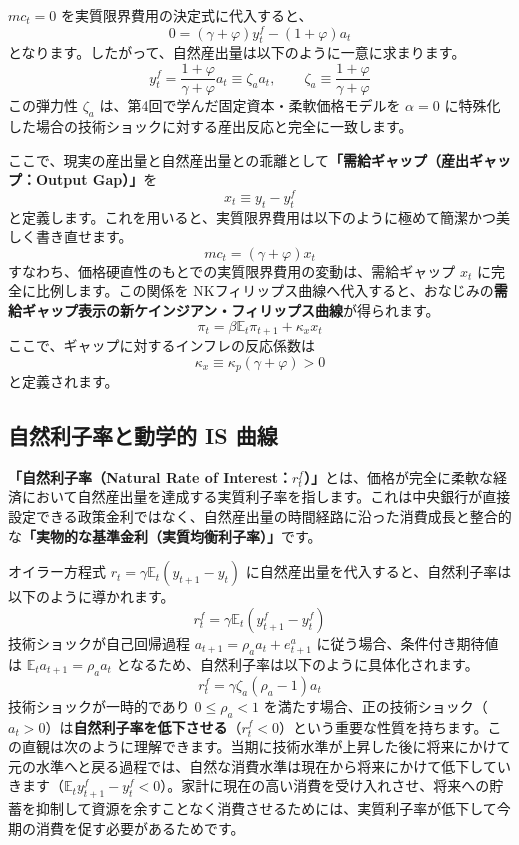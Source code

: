 \documentclass[
  japanese,
  lualatex,
  ja=standard,
  12pt,
  a4paper]{ltjsarticle}
\begin{document}
\(mc_t=0\) を実質限界費用の決定式に代入すると、 \[
0=
(\gamma+\varphi)y_t^f
-(1+\varphi)a_t
\] となります。したがって、自然産出量は以下のように一意に求まります。 \[
y_t^f=
\frac{1+\varphi}{\gamma+\varphi}
a_t
\equiv
\zeta_a a_t,
\qquad
\zeta_a\equiv
\frac{1+\varphi}{\gamma+\varphi}
\] この弾力性 \(\zeta_a\) は、第4回で学んだ固定資本・柔軟価格モデルを
\(\alpha=0\)
に特殊化した場合の技術ショックに対する産出反応と完全に一致します。

ここで、現実の産出量と自然産出量との乖離として\textbf{「需給ギャップ（産出ギャップ：Output
Gap）」}を \[
x_t\equiv y_t-y_t^f
\]
と定義します。これを用いると、実質限界費用は以下のように極めて簡潔かつ美しく書き直せます。
\[
mc_t=
(\gamma+\varphi)x_t
\] すなわち、価格硬直性のもとでの実質限界費用の変動は、需給ギャップ
\(x_t\) に完全に比例します。この関係を
NKフィリップス曲線へ代入すると、おなじみの\textbf{需給ギャップ表示の新ケインジアン・フィリップス曲線}が得られます。
\[
\pi_t=\beta\mathbb{E}_t\pi_{t+1}+\kappa_x x_t
\] ここで、ギャップに対するインフレの反応係数は \[
\kappa_x\equiv
\kappa_p(\gamma+\varphi)>0
\] と定義されます。

\subsection{自然利子率と動学的 IS
曲線}\label{ux81eaux7136ux5229ux5b50ux7387ux3068ux52d5ux5b66ux7684-is-ux66f2ux7dda}

\textbf{「自然利子率（Natural Rate of
Interest：\(r_t^f\)）」}とは、価格が完全に柔軟な経済において自然産出量を達成する実質利子率を指します。これは中央銀行が直接設定できる政策金利ではなく、自然産出量の時間経路に沿った消費成長と整合的な\textbf{「実物的な基準金利（実質均衡利子率）」}です。

オイラー方程式 \(r_t=\gamma\mathbb{E}_t(y_{t+1}-y_t)\)
に自然産出量を代入すると、自然利子率は以下のように導かれます。 \[
r_t^f
=
\gamma\mathbb{E}_t(y_{t+1}^f-y_t^f)
\] 技術ショックが自己回帰過程 \(a_{t+1}=\rho_a a_t+e_{t+1}^a\)
に従う場合、条件付き期待値は \(\mathbb{E}_t a_{t+1}=\rho_a a_t\)
となるため、自然利子率は以下のように具体化されます。 \[
r_t^f
=
\gamma\zeta_a(\rho_a-1)a_t
\] 技術ショックが一時的であり \(0\leq\rho_a<1\)
を満たす場合、正の技術ショック（\(a_t>0\)）は\textbf{自然利子率を低下させる}（\(r_t^f<0\)）という重要な性質を持ちます。この直観は次のように理解できます。当期に技術水準が上昇した後に将来にかけて元の水準へと戻る過程では、自然な消費水準は現在から将来にかけて低下していきます（\(\mathbb{E}_t y_{t+1}^f - y_t^f < 0\)）。家計に現在の高い消費を受け入れさせ、将来への貯蓄を抑制して資源を余すことなく消費させるためには、実質利子率が低下して今期の消費を促す必要があるためです。
\end{document}
